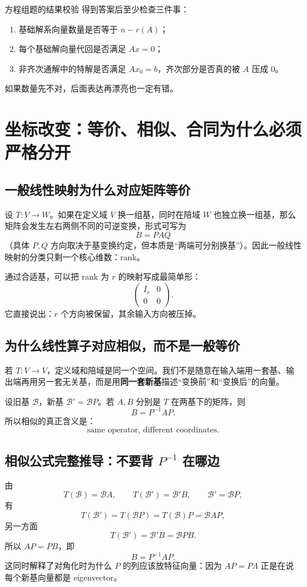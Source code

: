 \documentclass[11pt,a4paper,openany]{ctexbook}
\newcommand{\key}[1]{\textbf{\color{deep}#1}}
\begin{document}
\begin{examBox}{方程组题的结果校验}
得到答案后至少检查三件事：
\begin{enumerate}
  \item 基础解系向量数量是否等于 $n-r(A)$；
  \item 每个基础解向量代回是否满足 $Ax=0$；
  \item 非齐次通解中的特解是否满足 $Ax_0=b$，齐次部分是否真的被 $A$ 压成 0。
\end{enumerate}
如果数量先不对，后面表达再漂亮也一定有错。
\end{examBox}

\chapter{坐标改变：等价、相似、合同为什么必须严格分开}

\section{一般线性映射为什么对应矩阵等价}
设 $T:V\to W$。如果在定义域 $V$ 换一组基，同时在陪域 $W$ 也独立换一组基，那么矩阵会发生左右两侧不同的可逆变换，形式可写为
\[
B=PAQ
\]
（具体 $P,Q$ 方向取决于基变换约定，但本质是“两端可分别换基”）。因此一般线性映射的分类只剩一个核心维数：rank。

通过合适基，可以把 rank 为 $r$ 的映射写成最简单形：
\[
\boxed{
\begin{pmatrix}
I_r&0\\0&0
\end{pmatrix}}.
\]
它直接说出：$r$ 个方向被保留，其余输入方向被压掉。

\section{为什么线性算子对应相似，而不是一般等价}
若 $T:V\to V$，定义域和陪域是同一个空间。我们不是随意在输入端用一套基、输出端再用另一套无关基，而是用\key{同一套新基}描述“变换前”和“变换后”的向量。

设旧基 $\mathcal B$，新基 $\mathcal B'=\mathcal BP$。若 $A,B$ 分别是 $T$ 在两基下的矩阵，则
\[
\boxed{B=P^{-1}AP}.
\]
所以相似的真正含义是：
\[
\boxed{\text{same operator, different coordinates}.}
\]

\section{相似公式完整推导：不要背 $P^{-1}$ 在哪边}
由
\[
T(\mathcal B)=\mathcal BA,\qquad T(\mathcal B')=\mathcal B'B,\qquad \mathcal B'=\mathcal BP,
\]
有
\[
T(\mathcal B')=T(\mathcal BP)=T(\mathcal B)P=\mathcal BAP,
\]
另一方面
\[
T(\mathcal B')=\mathcal B'B=\mathcal BPB.
\]
所以 $AP=PB$，即
\[
\boxed{B=P^{-1}AP}.
\]
这同时解释了对角化时为什么 $P$ 的列应该放特征向量：因为 $AP=P\Lambda$ 正是在说每个新基向量都是 eigenvector。
\end{document}
